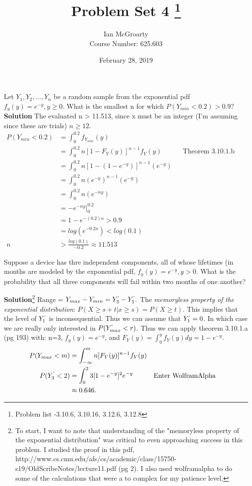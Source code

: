 \documentclass[12pt]{article}
\title{Problem Set 4 \thanks{Problem list -3.10.6, 3.10.16, 3.12.6, 3.12.8}}
\author{Ian McGroarty \\
	Course Number: 625.603}
\date{February 28, 2019}
\newenvironment{problem}[2][Problem]{\begin{trivlist}
\item[\hskip \labelsep {\bfseries #1}\hskip \labelsep {\bfseries #2.}]}{\end{trivlist}}
\begin{document}
\maketitle

\begin{problem}{3.10.6} Let $Y_1, Y_2, ... , Y_n$ be a random sample from the exponential pdf $f_y(y) = e^{-y}, y \geq 0$. What is the smallest n for which $P(Y_{min} < 0.2) > 0.9$? \\
\textbf{Solution} The evaluated n > 11.513, since x must be an integer (I'm assuming since these are trials) $n\geq 12$.
\begin{align*}
P(Y_{min}<0.2) &= \int_0^{0.2} f_{Y_{min}}(y) \\
&=\int_0^{0.2} n[1-F_Y(y)]^{n-1}f_Y(y) && \text{Theorem 3.10.1.b (pg193)} \\
&=\int_0^{0.2} n[1-(1-e^{-y})]^{n-1}(e^{-y}) \\
&= \int_0^{0.2}n(e^{-y})^{n-1}(e^{-y}) \\
&= \int_0^{0.2}n(e^{-ny}) \\
&= -e^{-ny} \Big|_0^{0.2} \\
&= 1-e^{-(0.2)n} >0.9 \\
&= log(e^{-0.2n}) < log(0.1) \\
n&>\frac{log(0.1)}{-0.2} \approx 11.513
\end{align*}

\end{problem}

\begin{problem}{3.10.16} Suppose a device has thre independent components, all of whose lifetimes (in months are modeled by the exponential pdf, $f_y(y) = e^{-y}, y > 0 $. What is the probability that all three components will fail within two months of one another? 

\textbf{Solution}\footnote{To start, I want to note that understanding of the "memoryless property of the exponential distribution" was critical to even approaching success in this problem. I studied the proof in this pdf, http://www.cs.cmu.edu/afs/cs/academic/class/15750-s19/OldScribeNotes/lecture11.pdf (pg 2). I also used wolframalpha to do some of the calculations that were a to complex for my patience level.} Range = $Y_{max}-Y_{min}=Y^`_3-Y^`_1.$ The \textit{memoryless property of the exponential distribution}: $P(X\geq s+t | x \geq s) = P(X\geq t)$. This implies that the level of $Y^`_1$ is inconsequential. Thus we can assume that $Y^`_1 = 0$. In which case we are really only interested in $P(Y^`_{max} < r)$. Thus we can apply theorem 3.10.1.a (pg 193) with: n=3, $f_y(y)=e^{-y}$, and $F_Y(y) = \int_0^y f_Y(y)dy = 1-e^{-y}$. 
\begin{align*}
P(Y_{max} < m) &= \int_{-\infty}^m n[F_Y(y)]^{n-1}f_Y(y) \\
P(Y^`_3 < 2) &= \int_0^2  3[1-e^{-y}]^2 e^{-y} &&\text{Enter WolframAlpha} \\
&\approx 0.646. 
\end{align*}
\end{problem}
\end{document}
